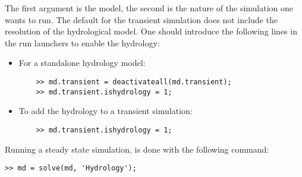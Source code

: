 The first argument is the model, the second is the nature of the simulation one wants to run. The default for the transient simulation does not include the resolution of the hydrological model. One should introduce the following lines in the run launchers to enable the hydrology:
\begin{itemize}
	\item For a standalone hydrology model:
	\begin{lstlisting}
	>> md.transient = deactivateall(md.transient);
	>> md.transient.ishydrology = 1;
	\end{lstlisting}
\end{itemize}
\begin{itemize}
	\item To add the hydrology to a transient simulation:
	\begin{lstlisting}
	>> md.transient.ishydrology = 1;
	\end{lstlisting}
\end{itemize}

Running a steady state simulation, is done with the following command:
\begin{lstlisting}
>> md = solve(md, 'Hydrology');
\end{lstlisting}

\clearpage %
